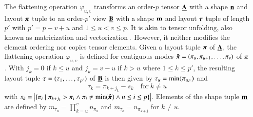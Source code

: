 The flattening operation $\varphi_{u,v}$ transforms an order-$p$ tensor $\underline{\mathbf{A}}$ with a shape $\mathbf{n}$ and layout $\boldsymbol{\pi}$ tuple to an order-$p'$ view $\underline{\mathbf{B}}$ with a shape $\mathbf{m}$ and layout $\boldsymbol{\tau}$ tuple of length $p'$ with $p' = p-v+u$ and $1 \leq u < v \leq p$.
It is akin to tensor unfolding, also known as matricization and vectorization \cite[p.459]{kolda:2009:decompositions}.
However, it neither modifies the element ordering nor copies tensor elements.
Given a layout tuple $\boldsymbol{\pi}$ of $\underline{\mathbf{A}}$, the flattening operation $\varphi_{u,v}$ is defined for contiguous modes $\boldsymbol{\hat{\pi}} = (\pi_u,\pi_{u+1}, \dots, \pi_{v})$ of $\boldsymbol{\pi}$.
With $j_k = 0$ if $k \leq u$ and $j_k = v-u$ if $k>u$ where $1 \leq k \leq p'$, the resulting layout tuple $\boldsymbol{\tau} = (\tau_1,\dots,\tau_{p'})$ of $\underline{\mathbf{B}}$ is then given by $\tau_u = \min(\boldsymbol{\pi}_{u,v})$ and
$$\tau_k = \pi_{k+j_k} - s_k \quad \text{for} \ k \neq u$$ 
with $s_k = \left| \{ \pi_i \mid \pi_{k+j_k} > \pi_i \wedge \pi_i \neq \min(\boldsymbol{\hat{\pi}}) \wedge u \leq i \leq p \} \right|$.
Elements of the shape tuple $\mathbf{m}$ are defined by $m_{\tau_u} = \prod_{k=u}^v n_{\pi_k}$ and $m_{\tau_k} = n_{\pi_{k+j}}$ for $k \neq u$.


